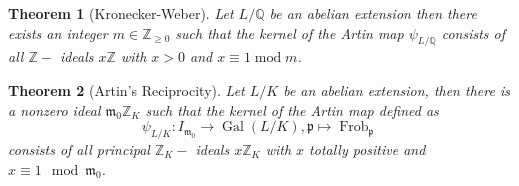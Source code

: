 \documentclass{article}
\theoremstyle{break}
\newtheorem{theorem}{Theorem}[section]
\def\Gal{\mathop{\mathrm{Gal}}\nolimits}
\def\Gal{\mathop{\mathrm{Gal}}\nolimits}
\def\modulo{\mathop{\mathrm{mod}}\nolimits}
\def\Frob{\mathop{\mathrm{Frob}}\nolimits}
\def\Gal{\mathop{\mathrm{Gal}}\nolimits}
\def\modulo{\mathop{\mathrm{mod }}\nolimits}
\begin{document}
\begin{theorem}[Kronecker-Weber]
Let $L/ \mathbb{Q}$ be an abelian extension then there exists an integer $m\in \mathbb{Z}_{\geq 0}$ such that the kernel of the Artin map $\psi_{L/\mathbb{Q}}$ consists of all $\mathbb{Z}-$ ideals $x\mathbb{Z}$ with $x>0$ and $x\equiv 1  \modulo  m$.
\end{theorem}

\begin{theorem}[Artin's Reciprocity]
Let $L/K$ be an abelian extension, then there is a nonzero ideal $\mathfrak{m}_{0} \mathbb{Z}_{K}$ such that the kernel of the Artin map defined as 
\[  \psi_{L/K}: I_{\mathfrak{m}_{0}} \rightarrow \Gal(L/K), \mathfrak{p}\mapsto \Frob_{\mathfrak{p}}\]
consists of all principal $\mathbb{Z}_{K}-$ ideals $x\mathbb{Z}_{K}$ with $x$ totally positive and $x\equiv 1 \mod \mathfrak{m}_{0}$.
\end{theorem}
\end{document}
